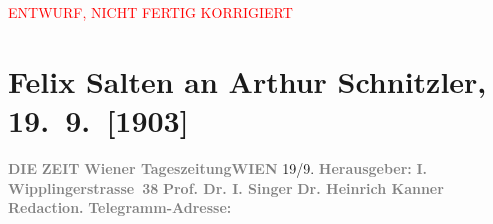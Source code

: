 
\begin{center}
            \textcolor{red}{ENTWURF, NICHT FERTIG KORRIGIERT}
                      \end{center}
            
         
         \renewcommand{\erwaehntePersonen}{Personen: Max Eugen Burckhard, Karl Glossy, Heinrich Kanner, Richard Muther, Ferdinand von Saar, August Sauer, Isidor Singer}
         \renewcommand{\erwaehnteInstitutionen}{Institutionen: Die Zeit}
         \renewcommand{\erwaehnteOrte}{Orte: Wien, Wipplingerstraße}
         \renewcommand{\erwaehnteWerke}{}
               \section[Felix Salten an Arthur Schnitzler, 19. 9. {[}1903{]}]{ Felix Salten an Arthur Schnitzler, 19. 9. {[}1903{]}}\nopagebreak{}\rehead{ }\begin{ledgroupsized}[t]{13cm}\normalsize\beginnumbering \toendnotes[C]{\smallbreak\pagebreak[2]} 
\toendnotes[C]{\smallbreak}\pstart
           \noindent{}{\pb}\textcolor{gray}{\textbf{DIE}}\pend
           \pstart
           \textcolor{gray}{\textbf{ZEIT}}\pend
           \pstart
           \textcolor{gray}{\textbf{Wiener Tageszeitung}}\hfill \textcolor{gray}{\textbf{WIEN}}{ }19/9.\pend
           \pstart
           \textcolor{gray}{\textbf{Herausgeber: }}\hfill \textcolor{gray}{\textbf{I. Wipplingerstrasse 38}}\pend
           \pstart
           \textcolor{gray}{\textbf{Prof. Dr. I. Singer}}\pend
           \pstart
           \textcolor{gray}{\textbf{Dr. Heinrich Kanner}}\pend
           \pstart
           \textcolor{gray}{\textbf{Redaction.}}\pend
           \pstart
           \textcolor{gray}{\textbf{Telegramm-Adresse: \so{,{ }}}}\pend

\end{ledgroupsized}
